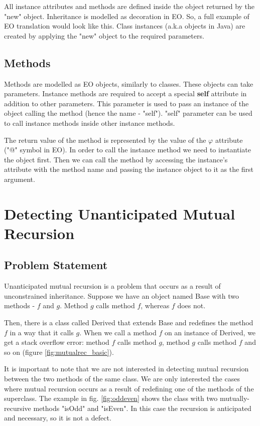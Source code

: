 All instance attributes and methods are defined inside the object returned by the "new" object. Inheritance is modelled as decoration in EO. So, a full example of EO translation would look like this. Class instances (a.k.a objects in Java) are created
by applying the "new" object to the required parameters.

\subsection{Methods}
Methods are modelled as EO objects, similarly to classes. These objects can take parameters.
Instance methods are required to accept a special \textbf{self} attribute in addition to other parameters. This parameter is used to pass an instance of the object calling the method (hence the name - "self").
"self" parameter can be used to call instance methods inside other instance methods.

The return value of the method is represented by the value of the $\varphi$ attribute ("@" symbol in EO). In order to call the instance method we need to instantiate the object first. Then we can call the method by accessing the instance's attribute with the method name and passing the instance object to it as the first argument.

\section{Detecting Unanticipated Mutual Recursion}
\label{met:mutualrec}
\subsection{Problem Statement}
Unanticipated mutual recursion is a problem that occurs as a result of unconstrained inheritance. Suppose we have an object named Base with two methods - $f$ and $g$. Method $g$ calls method $f$, whereas $f$ does not.


Then, there is a class called Derived that extends Base and redefines the method $f$ in a way that it calls $g$. When we call a method $f$ on an instance of Derived, we get a stack overflow error: method $f$ calls method $g$, method $g$ calls method $f$ and so on (figure \ref{fig:mutualrec_basic}).

It is important to note that we are not interested in detecting mutual recursion between the two methods of the same class. We are only interested the cases where mutual recursion occurs as a result of redefining one of the methods of the superclass. The example in fig. \ref{fig:oddeven} shows the class with two mutually-recursive methods "isOdd" and "isEven". In this case the recursion is anticipated and necessary, so it is not a defect.

